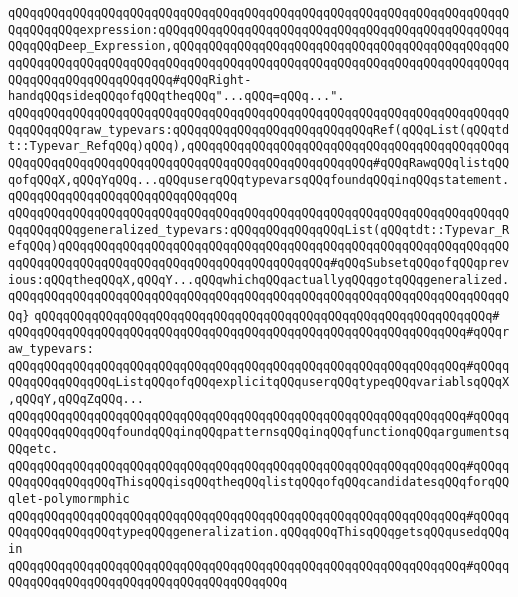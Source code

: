 \verb|qQQqqQQqqQQqqQQqqQQqqQQqqQQqqQQqqQQqqQQqqQQqqQQqqQQqqQQqqQQqqQQqqQQqqQQqqQQqqQQqexpression:qQQqqQQqqQQqqQQqqQQqqQQqqQQqqQQqqQQqqQQqqQQqqQQqqQQqqQQqDeep_Expression,qQQqqQQqqQQqqQQqqQQqqQQqqQQqqQQqqQQqqQQqqQQqqQQqqQQqqQQqqQQqqQQqqQQqqQQqqQQqqQQqqQQqqQQqqQQqqQQqqQQqqQQqqQQqqQQqqQQqqQQqqQQqqQQqqQQqqQQqqQQq#qQQqRight-handqQQqsideqQQqofqQQqtheqQQq"...qQQq=qQQq...".|\newline
\verb|qQQqqQQqqQQqqQQqqQQqqQQqqQQqqQQqqQQqqQQqqQQqqQQqqQQqqQQqqQQqqQQqqQQqqQQqqQQqqQQqraw_typevars:qQQqqQQqqQQqqQQqqQQqqQQqqQQqRef(qQQqList(qQQqtdt::Typevar_RefqQQq)qQQq),qQQqqQQqqQQqqQQqqQQqqQQqqQQqqQQqqQQqqQQqqQQqqQQqqQQqqQQqqQQqqQQqqQQqqQQqqQQqqQQqqQQqqQQqqQQqqQQq#qQQqRawqQQqlistqQQqofqQQqX,qQQqYqQQq...qQQquserqQQqtypevarsqQQqfoundqQQqinqQQqstatement.qQQqqQQqqQQqqQQqqQQqqQQqqQQqqQQq|\newline
\verb|qQQqqQQqqQQqqQQqqQQqqQQqqQQqqQQqqQQqqQQqqQQqqQQqqQQqqQQqqQQqqQQqqQQqqQQqqQQqqQQqgeneralized_typevars:qQQqqQQqqQQqqQQqList(qQQqtdt::Typevar_RefqQQq)qQQqqQQqqQQqqQQqqQQqqQQqqQQqqQQqqQQqqQQqqQQqqQQqqQQqqQQqqQQqqQQqqQQqqQQqqQQqqQQqqQQqqQQqqQQqqQQqqQQqqQQqqQQq#qQQqSubsetqQQqofqQQqprevious:qQQqtheqQQqX,qQQqY...qQQqwhichqQQqactuallyqQQqgotqQQqgeneralized.|\newline
\verb|qQQqqQQqqQQqqQQqqQQqqQQqqQQqqQQqqQQqqQQqqQQqqQQqqQQqqQQqqQQqqQQqqQQqqQQq}|\newline
\verb|qQQqqQQqqQQqqQQqqQQqqQQqqQQqqQQqqQQqqQQqqQQqqQQqqQQqqQQqqQQqqQQq#|\newline
\verb|qQQqqQQqqQQqqQQqqQQqqQQqqQQqqQQqqQQqqQQqqQQqqQQqqQQqqQQqqQQqqQQq#qQQqraw_typevars:|\newline
\verb|qQQqqQQqqQQqqQQqqQQqqQQqqQQqqQQqqQQqqQQqqQQqqQQqqQQqqQQqqQQqqQQq#qQQqqQQqqQQqqQQqqQQqListqQQqofqQQqexplicitqQQquserqQQqtypeqQQqvariablsqQQqX,qQQqY,qQQqZqQQq...|\newline
\verb|qQQqqQQqqQQqqQQqqQQqqQQqqQQqqQQqqQQqqQQqqQQqqQQqqQQqqQQqqQQqqQQq#qQQqqQQqqQQqqQQqqQQqfoundqQQqinqQQqpatternsqQQqinqQQqfunctionqQQqargumentsqQQqetc.|\newline
\verb|qQQqqQQqqQQqqQQqqQQqqQQqqQQqqQQqqQQqqQQqqQQqqQQqqQQqqQQqqQQqqQQq#qQQqqQQqqQQqqQQqqQQqThisqQQqisqQQqtheqQQqlistqQQqofqQQqcandidatesqQQqforqQQqlet-polymormphic|\newline
\verb|qQQqqQQqqQQqqQQqqQQqqQQqqQQqqQQqqQQqqQQqqQQqqQQqqQQqqQQqqQQqqQQq#qQQqqQQqqQQqqQQqqQQqtypeqQQqgeneralization.qQQqqQQqThisqQQqgetsqQQqusedqQQqin|\newline
\verb|qQQqqQQqqQQqqQQqqQQqqQQqqQQqqQQqqQQqqQQqqQQqqQQqqQQqqQQqqQQqqQQq#qQQqqQQqqQQqqQQqqQQqqQQqqQQqqQQqqQQqqQQqqQQq|\newline
